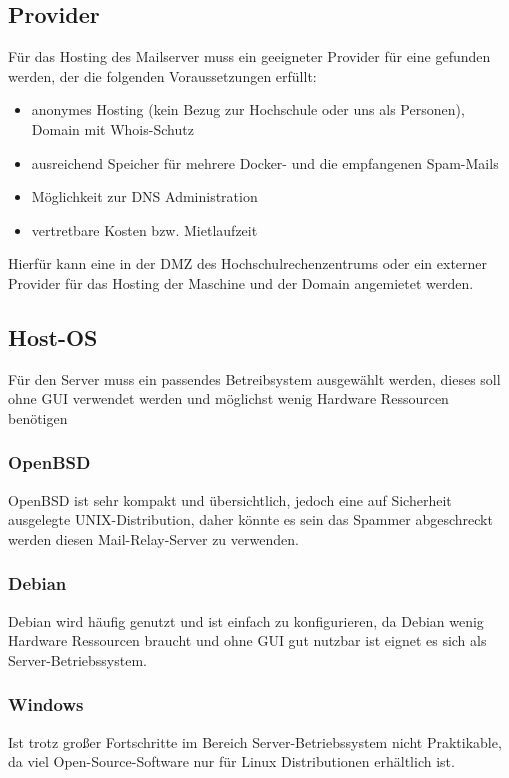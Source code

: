 \documentclass[a4paper,11pt,singlespacing]{article}
\begin{document}
	\subsection{Provider}\label{sec:Provider}
		Für das Hosting des Mailserver  muss ein geeigneter Provider für eine  gefunden werden, der die folgenden Voraussetzungen erfüllt:
		\begin{itemize}
		    \item anonymes Hosting (kein Bezug zur Hochschule oder uns als Personen), Domain mit Whois-Schutz
			\item ausreichend Speicher für mehrere Docker- und die empfangenen Spam-Mails
			\item Möglichkeit zur DNS Administration
			\item vertretbare Kosten bzw. Mietlaufzeit
		\end{itemize}
		
		Hierfür kann eine  in der DMZ des Hochschulrechenzentrums oder ein externer Provider für das Hosting der Maschine und der Domain angemietet werden.

	\subsection{Host-OS}\label{sec:Host-Maschine}
		Für den Server muss ein passendes Betreibsystem ausgewählt werden, dieses soll ohne GUI verwendet werden und möglichst wenig Hardware Ressourcen benötigen
		\subsubsection{OpenBSD}\label{sec:OpenBSD}
			OpenBSD ist sehr kompakt und übersichtlich, jedoch eine auf Sicherheit ausgelegte UNIX-Distribution, daher könnte es sein das Spammer abgeschreckt werden diesen Mail-Relay-Server zu verwenden.
		\subsubsection{Debian}\label{sec:Debian}
			Debian wird häufig genutzt und ist einfach zu konfigurieren, da Debian wenig Hardware Ressourcen braucht und ohne GUI gut nutzbar ist eignet es sich als Server-Betriebssystem.
		\subsubsection{Windows}\label{sec:Windows}
			Ist trotz großer Fortschritte im Bereich Server-Betriebssystem nicht Praktikable, da viel Open-Source-Software nur für Linux Distributionen erhältlich ist.
\end{document}
